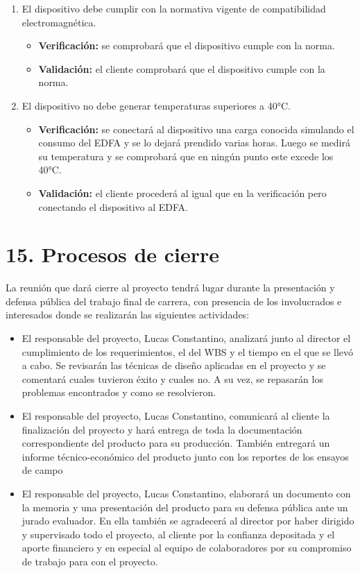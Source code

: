 \documentclass[
11pt, %
]{charter}
\begin{document}
\begin{enumerate}
\begin{enumerate}
\item El dispositivo debe cumplir con la normativa vigente de compatibilidad electromagnética.
\begin{itemize}
	\item \textbf{Verificación:} se comprobará que el dispositivo cumple con la norma.
	\item \textbf{Validación:} el cliente comprobará que el dispositivo cumple con la norma.
\end{itemize}

\item El dispositivo no debe generar temperaturas superiores a 40°C.
\begin{itemize}
	\item \textbf{Verificación:} se conectará al dispositivo una carga conocida simulando el consumo del EDFA y se lo dejará prendido varias horas. Luego se medirá su temperatura y se comprobará que en ningún punto este excede los 40°C.
	\item \textbf{Validación:} el cliente procederá al igual que en la verificación pero conectando el dispositivo al EDFA.
\end{itemize}

\end{enumerate}
\end{enumerate}

\section{15. Procesos de cierre}    
\label{sec:cierre}

La reunión que dará cierre al proyecto tendrá lugar durante la presentación y defensa pública del trabajo final de carrera, con presencia de los involucrados e interesados donde se realizarán las siguientes actividades:

\begin{itemize}
	\item El responsable del proyecto, Lucas Constantino, analizará junto al director el cumplimiento de los requerimientos, el del WBS y el tiempo en el que se llevó a cabo. Se revisarán las técnicas de diseño aplicadas en el proyecto y se comentará cuales tuvieron éxito y cuales no. A su vez, se repasarán los problemas encontrados y como se resolvieron.
	\item El responsable del proyecto, Lucas Constantino, comunicará al cliente la finalización del proyecto y hará entrega de toda la documentación correspondiente del producto para su producción. También entregará un informe técnico-económico del producto junto con los reportes de los ensayos de campo
	\item El responsable del proyecto, Lucas Constantino, elaborará un documento con la memoria y una presentación del producto para su defensa pública ante un jurado evaluador. En ella también se agradecerá al director por haber dirigido y supervisado todo el proyecto, al cliente por la confianza depositada y el aporte financiero y en especial al equipo de colaboradores por su compromiso de trabajo para con el proyecto.
\end{itemize}
\end{document}
